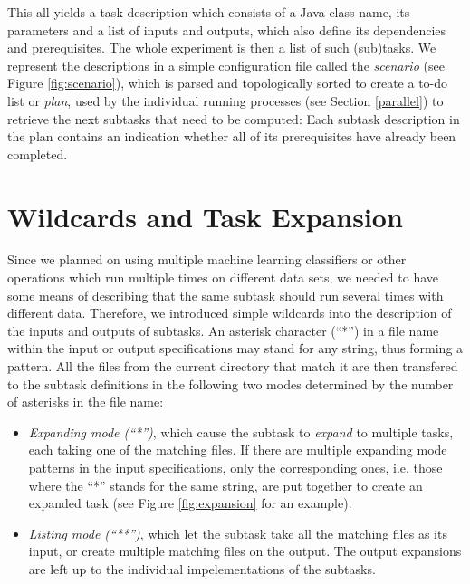 \documentclass[12pt,notitlepage]{report}
\begin{document}
This all yields a task description which consists of a Java class name, its parameters and a list of inputs and outputs, which also define its dependencies and prerequisites. The whole experiment is then a list of such (sub)tasks. We represent the descriptions in a simple configuration file called the \emph{scenario} (see Figure \ref{fig:scenario}), which is parsed and topologically sorted \citep{kahn62} to create a to-do list or \emph{plan}, used by the individual running processes (see Section \ref{parallel}) to retrieve the next subtasks that need to be computed: Each subtask description in the plan contains an indication whether all of its prerequisites have already been completed.

\section{Wildcards and Task Expansion}\label{expansions}

Since we planned on using multiple machine learning classifiers or other operations which run multiple times on different data sets, we needed to have some means of describing that the same subtask should run several times with different data. Therefore, we introduced simple wildcards into the description of the inputs and outputs of subtasks. An asterisk character (``*'') in a file name within the input or output specifications may stand for any string, thus forming a pattern. All the files from the current directory that match it are then transfered to the subtask definitions in the following two modes determined by the number of asterisks in the file name:
\begin{itemize}
    \item \emph{Expanding mode (``*'')}, which cause the subtask to \emph{expand} to multiple tasks, each taking one of the matching files. If there are multiple expanding mode patterns in the input specifications, only the corresponding ones, i.e. those where the ``*'' stands for the same string, are put together to create an expanded task (see Figure \ref{fig:expansion} for an example).
    \item \emph{Listing mode (``**'')}, which let the subtask take all the matching files as its input, or create multiple matching files on the output. The output expansions are left up to the individual impelementations of the subtasks.
\end{itemize}
\end{document}
